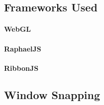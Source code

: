 		\subsection{Frameworks Used}
			\paragraph{WebGL}
			\paragraph{RaphaelJS}
			\paragraph{RibbonJS}

		\subsection{Window Snapping}


